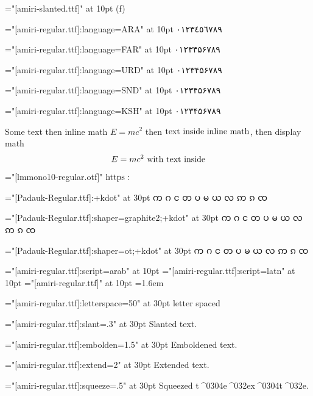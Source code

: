 \font\amiriteni="[amiri-slanted.ttf]" at 10pt
({\amiriteni f\/})

\def\l#1#2{%
  \begingroup%
  \font\testl="[amiri-regular.ttf]:language=#1" at 10pt
  \testl #2%
  \endgroup%
}
\l{ARA}{٠١٢٣٤٥٦٧٨٩}\par
\l{FAR}{۰۱۲۳۴۵۶۷۸۹}\par
\l{URD}{۰۱۲۳۴۵۶۷۸۹}\par
\l{SND}{۰۱۲۳۴۵۶۷۸۹}\par
\l{KSH}{۰۱۲۳۴۵۶۷۸۹}\par

Some text then inline math $E=mc^2$ then $\hbox{text inside inline math}$, then
display math $$E=mc^2\hbox{ with text inside}$$

\begingroup
\font\lmmono="[lmmono10-regular.otf]"
\lmmono $\fam0 \textfont0\font https:$
\endgroup

\font\padauk="[Padauk-Regular.ttf]:+kdot" at 30pt\padauk
က ဂ င တ ပ မ ယ လ ဢ ၵ ၸ \par
\font\padauk="[Padauk-Regular.ttf]:shaper=graphite2;+kdot" at 30pt\padauk
က ဂ င တ ပ မ ယ လ ဢ ၵ ၸ \par
\font\padauk="[Padauk-Regular.ttf]:shaper=ot;+kdot"        at 30pt\padauk
က ဂ င တ ပ မ ယ လ ဢ ၵ ၸ \par


\font\arab="[amiri-regular.ttf]:script=arab" at 10pt\arab
\font\latn="[amiri-regular.ttf]:script=latn" at 10pt\latn
\font\dflt="[amiri-regular.ttf]" at 10pt\dflt
\baselineskip=1.6em

\font{}="[amiri-regular.ttf]:letterspace=50" at 30pt
letter spaced

\font\slanted="[amiri-regular.ttf]:slant=.3" at 30pt\slanted
Slanted text.

\font\embolden="[amiri-regular.ttf]:embolden=1.5" at 30pt\embolden
Emboldened text.

\font\extend="[amiri-regular.ttf]:extend=2" at 30pt\extend
Extended text.

\font\squeeze="[amiri-regular.ttf]:squeeze=.5" at 30pt\squeeze
Squeezed t^^^^0304e^^^^032ex^^^^0304t^^^^032e.

\endgroup\vfill\eject

